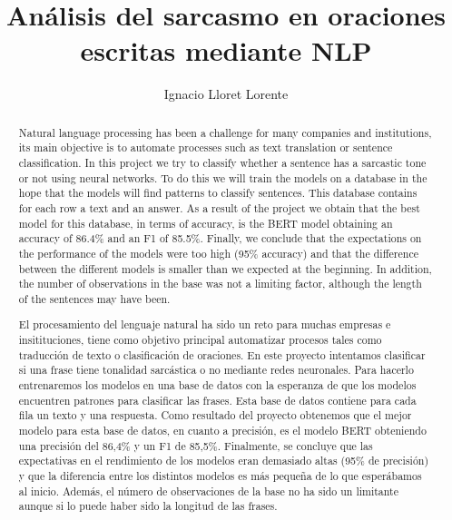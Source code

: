 \documentclass[10pt,riqno,a4paper,twoside]{article}\usepackage[]{graphicx}\usepackage[]{color}
\begin{document}
\title{An\'{a}lisis del sarcasmo en oraciones escritas mediante NLP}
\author{Ignacio Lloret Lorente}


\maketitle 
\clearpage
{} 
\begin{abstract}

Natural language processing has been a challenge for many companies and institutions, its main objective is to automate processes such as text translation or sentence classification. In this project we try to classify whether a sentence has a sarcastic tone or not using neural networks. To do this we will train the models on a database in the hope that the models will find patterns to classify sentences. This database contains for each row a text and an answer.  As a result of the project we obtain that the best model for this database, in terms of accuracy, is the BERT model obtaining an accuracy of 86.4\% and an F1 of 85.5\%. Finally, we conclude that the expectations on the performance of the models were too high (95\% accuracy) and that the difference between the different models is smaller than we expected at the beginning. In addition, the number of observations in the base was not a limiting factor, although the length of the sentences may have been.


\end{abstract}


\begin{abstract}

El procesamiento del lenguaje natural ha sido un reto para muchas empresas e insitituciones, tiene como objetivo principal automatizar procesos tales como traducción de texto o clasificación de oraciones. En este proyecto intentamos clasificar si una frase tiene tonalidad sarcástica o no mediante redes neuronales. Para hacerlo entrenaremos los modelos en una base de datos con la esperanza de que los modelos encuentren patrones para clasificar las frases. Esta base de datos contiene para cada fila un texto y una respuesta.  Como resultado del proyecto obtenemos que el mejor modelo para esta base de datos, en cuanto a precisión, es el modelo BERT obteniendo una precisión del 86,4\% y un F1 de 85,5\%. Finalmente, se concluye que las expectativas en el rendimiento de los modelos eran demasiado altas (95\% de precisión) y que la diferencia entre los distintos modelos es más pequeña de lo que esperábamos al inicio. Además, el número de observaciones de la base no ha sido un limitante aunque si lo puede haber sido la longitud de las frases.


\end{abstract}
\end{document}
